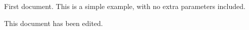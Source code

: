 \documentclass{article}
\begin{document}
First document. This is a simple example, with no
extra parameters included.

This document has been edited.
\end{document}
